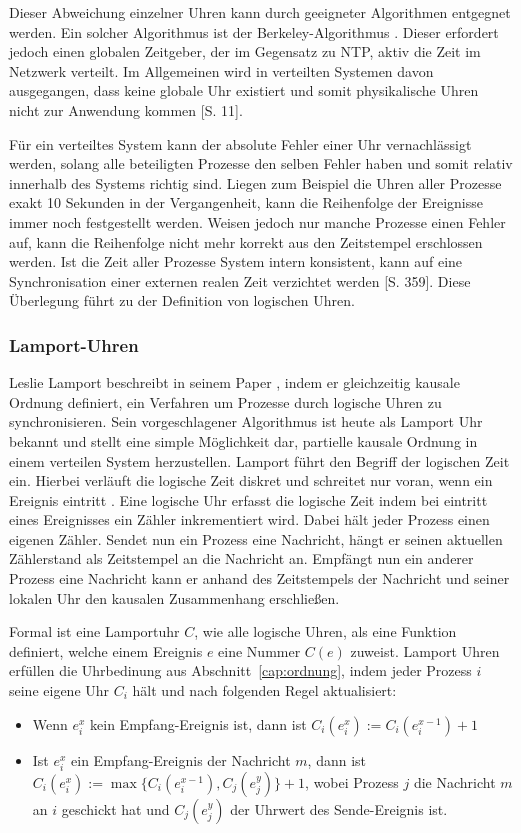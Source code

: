 Dieser Abweichung einzelner Uhren kann durch geeigneter Algorithmen entgegnet werden.
Ein solcher Algorithmus ist der Berkeley-Algorithmus \cite{gusella1989accuracy}. 
Dieser erfordert jedoch einen globalen Zeitgeber, der im Gegensatz zu NTP, aktiv die Zeit im Netzwerk verteilt.
Im Allgemeinen wird in verteilten Systemen davon ausgegangen, dass keine globale Uhr existiert und somit physikalische Uhren nicht zur Anwendung kommen \cite{Tanenbaum2007}[S. 11].

Für ein verteiltes System kann der absolute Fehler einer Uhr vernachlässigt werden, solang alle beteiligten Prozesse den selben Fehler haben und somit relativ innerhalb des Systems richtig sind.
Liegen zum Beispiel die Uhren aller Prozesse exakt 10 Sekunden in der Vergangenheit, kann die Reihenfolge der Ereignisse immer noch festgestellt werden. 
Weisen jedoch nur manche Prozesse einen Fehler auf, kann die Reihenfolge nicht mehr korrekt aus den Zeitstempel erschlossen werden.
Ist die Zeit aller Prozesse System intern konsistent, kann auf eine Synchronisation einer externen realen Zeit verzichtet werden \cite{bengel2015masterkurs}[S. 359].
Diese Überlegung führt zu der Definition von logischen Uhren.

\subsubsection{Lamport-Uhren}
\label{cap:vectorclock}
Leslie Lamport beschreibt in seinem Paper \cite{Lamport1978}, indem er gleichzeitig kausale Ordnung definiert, ein Verfahren um Prozesse durch logische Uhren zu synchronisieren.
Sein vorgeschlagener Algorithmus ist heute als Lamport Uhr bekannt und stellt eine simple Möglichkeit dar, partielle kausale Ordnung in einem verteilen System herzustellen.
Lamport führt den Begriff der logischen Zeit ein.
Hierbei verläuft die logische Zeit diskret und schreitet nur voran, wenn ein Ereignis eintritt \cite{leon2013ereignisdiskrete}.
Eine logische Uhr erfasst die logische Zeit indem bei eintritt eines Ereignisses ein Zähler inkrementiert wird.
Dabei hält jeder Prozess einen eigenen Zähler.
Sendet nun ein Prozess eine Nachricht, hängt er seinen aktuellen Zählerstand als Zeitstempel an die Nachricht an.
Empfängt nun ein anderer Prozess eine Nachricht kann er anhand des Zeitstempels der Nachricht und seiner lokalen Uhr den kausalen Zusammenhang erschließen.

Formal ist eine Lamportuhr $C$, wie alle logische Uhren, als eine Funktion definiert, welche einem Ereignis $e$ eine Nummer $C(e)$ zuweist.
Lamport Uhren erfüllen die Uhrbedinung aus Abschnitt~\ref{cap:ordnung}, indem jeder Prozess $i$ seine eigene Uhr $C_i$ hält und nach folgenden Regel aktualisiert:
\begin{itemize}
    \item Wenn $e_i^x$ kein Empfang-Ereignis ist, dann ist $C_i(e_i^x):=C_i(e_i^{x-1})+1$
    \item Ist $e_i^x$ ein Empfang-Ereignis der Nachricht $m$, dann ist $C_i(e_i^x):=\max\{C_i(e_i^{x-1}), C_j(e_j^y)  \} + 1$, wobei Prozess $j$ die Nachricht $m$ an $i$ geschickt hat und $C_j(e_j^y)$ der Uhrwert des Sende-Ereignis ist.
\end{itemize}

